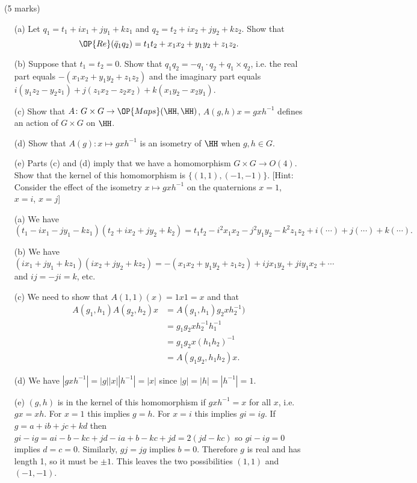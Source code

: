 \documentclass[12pt]{article}
\begin{document}
\vspace{1cm}

\begin{question}\ (5 marks)\\
  \begin{enumerate}
  \item[(a)]  Let $q_1=t_1+ix_1+jy_1+kz_1$ and $q_2=t_2+ix_2+jy_2+kz_2$. Show that
  \[\OP{Re}(\bar{q}_1q_2)=t_1t_2+x_1x_2+y_1y_2+z_1z_2.\]
  \item[(b)] Suppose that $t_1=t_2=0$. Show that $q_1q_2=-q_1\cdot q_2+q_1\times q_2$, i.e. the real part equals $-(x_1x_2+y_1y_2+z_1z_2)$ and the imaginary part equals $i(y_1z_2-y_2z_1)+j(z_1x_2-z_2x_2)+k(x_1y_2-x_2y_1)$.
  \item[(c)] Show that $A\colon G\times G\to\OP{Maps}(\HH,\HH)$, $A(g,h)x=gxh^{-1}$ defines an action of $G\times G$ on $\HH$.
  \item[(d)] Show that $A(g)\colon x\mapsto gxh^{-1}$ is an isometry of $\HH$ when $g,h\in G$.
  \item[(e)] Parts (c) and (d) imply that we have a homomorphism $G\times G\to O(4)$. Show that the kernel of this homomorphism is $\{(1,1),(-1,-1)\}$. [Hint: Consider the effect of the isometry $x\mapsto gxh^{-1}$ on the quaternions $x=1$, $x=i$, $x=j$]
  \end{enumerate}
\end{question}
\begin{answer}
  \begin{enumerate}
  \item[(a)] We have
    \[(t_1-ix_1-jy_1-kz_1)(t_2+ix_2+jy_2+k_2)=t_1t_2-i^2x_1x_2-j^2y_1y_2-k^2z_1z_2+i(\cdots)+j(\cdots)+k(\cdots).\]
  \item[(b)] We have
    \[(ix_1+jy_1+kz_1)(ix_2+jy_2+kz_2)=-(x_1x_2+y_1y_2+z_1z_2)+ijx_1y_2+jiy_1x_2+\cdots\]
    and $ij=-ji=k$, etc.
  \item[(c)] We need to show that $A(1,1)(x)=1x1=x$ and that
    \begin{align*}
      A(g_1,h_1)A(g_2,h_2)x&=A(g_1,h_1)g_2xh_2^{-1})\\
      &=g_1g_2xh_2^{-1}h_1^{-1}\\
      &=g_1g_2x(h_1h_2)^{-1}\\
      &=A(g_1g_2,h_1h_2)x.
    \end{align*}
  \item[(d)] We have $|gxh^{-1}|=|g||x||h^{-1}|=|x|$ since $|g|=|h|=|h^{-1}|=1$.
  \item[(e)] $(g,h)$ is in the kernel of this homomorphism if $gxh^{-1}=x$ for all $x$, i.e. $gx=xh$. For $x=1$ this implies $g=h$. For $x=i$ this implies $gi=ig$. If $g=a+ib+jc+kd$ then $gi-ig=ai-b-kc+jd-ia+b-kc+jd=2(jd-kc)$ so $gi-ig=0$ implies $d=c=0$. Similarly, $gj=jg$ implies $b=0$. Therefore $g$ is real and has length 1, so it must be $\pm 1$. This leaves the two possibilities $(1,1)$ and $(-1,-1)$.
  \end{enumerate}
\end{answer}
\end{document}
